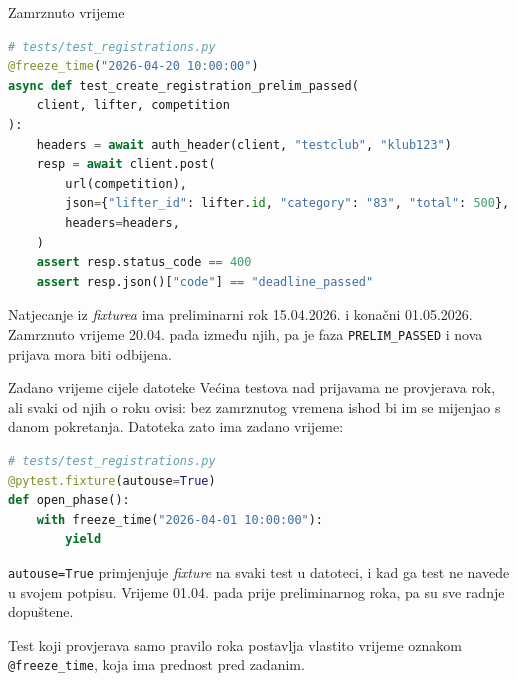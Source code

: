 \begin{frame}[fragile]{Zamrznuto vrijeme}
\begin{lstlisting}[language=python]
# tests/test_registrations.py
@freeze_time("2026-04-20 10:00:00")
async def test_create_registration_prelim_passed(
    client, lifter, competition
):
    headers = await auth_header(client, "testclub", "klub123")
    resp = await client.post(
        url(competition),
        json={"lifter_id": lifter.id, "category": "83", "total": 500},
        headers=headers,
    )
    assert resp.status_code == 400
    assert resp.json()["code"] == "deadline_passed"
\end{lstlisting}

\vspace{0.2em}
Natjecanje iz \emph{fixturea} ima preliminarni rok 15.04.2026. i konačni 01.05.2026. Zamrznuto vrijeme 20.04. pada između njih, pa je faza \texttt{PRELIM\_PASSED} i nova prijava mora biti odbijena.
\end{frame}

\begin{frame}[fragile]{Zadano vrijeme cijele datoteke}
Većina testova nad prijavama ne provjerava rok, ali svaki od njih o roku ovisi: bez zamrznutog vremena ishod bi im se mijenjao s danom pokretanja. Datoteka zato ima zadano vrijeme:

\begin{lstlisting}[language=python]
# tests/test_registrations.py
@pytest.fixture(autouse=True)
def open_phase():
    with freeze_time("2026-04-01 10:00:00"):
        yield
\end{lstlisting}

\vspace{0.4em}
\texttt{autouse=True} primjenjuje \emph{fixture} na svaki test u datoteci, i kad ga test ne navede u svojem potpisu. Vrijeme 01.04. pada prije preliminarnog roka, pa su sve radnje dopuštene.

\vspace{0.4em}
Test koji provjerava samo pravilo roka postavlja vlastito vrijeme oznakom \texttt{@freeze\_time}, koja ima prednost pred zadanim.
\end{frame}

